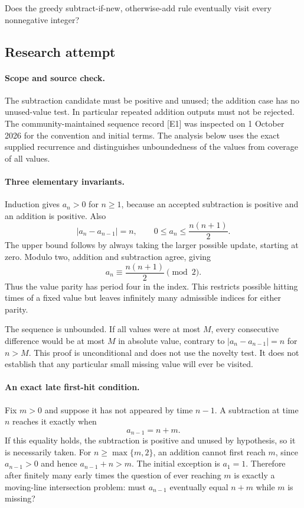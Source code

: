 \documentclass[11pt,a4paper]{article}
\begin{document}
Does the greedy subtract-if-new, otherwise-add rule eventually visit every nonnegative integer?

\subsection{Research attempt}

\paragraph{Scope and source check.}
The subtraction candidate must be positive and unused; the addition
case has no unused-value test. In particular repeated addition outputs
must not be rejected. The community-maintained sequence record [E1]
was inspected on 1 October 2026 for the convention and initial terms.
The analysis below uses the exact supplied recurrence and distinguishes
unboundedness of the values from coverage of all values.

\paragraph{Three elementary invariants.}
Induction gives $a_n>0$ for $n\ge1$, because an accepted subtraction
is positive and an addition is positive. Also
\[
 |a_n-a_{n-1}|=n,\qquad
 0\le a_n\le\frac{n(n+1)}2.
\]
The upper bound follows by always taking the larger possible update,
starting at zero. Modulo two, addition and subtraction agree, giving
\[
                  a_n\equiv\frac{n(n+1)}2\pmod2.
\]
Thus the value parity has period four in the index. This restricts
possible hitting times of a fixed value but leaves infinitely many
admissible indices for either parity.

The sequence is unbounded. If all values were at most $M$, every
consecutive difference would be at most $M$ in absolute value, contrary
to $|a_n-a_{n-1}|=n$ for $n>M$. This proof is unconditional and does
not use the novelty test. It does not establish that any particular
small missing value will ever be visited.

\paragraph{An exact late first-hit condition.}
Fix $m>0$ and suppose it has not appeared by time $n-1$. A subtraction
at time $n$ reaches it exactly when
\[
                            a_{n-1}=n+m.
\]
If this equality holds, the subtraction is positive and unused by
hypothesis, so it is necessarily taken. For $n\ge\max\{m,2\}$, an
addition cannot first reach $m$, since $a_{n-1}>0$ and hence
$a_{n-1}+n>m$. The initial exception is $a_1=1$. Therefore after
finitely many early times the
question of ever reaching $m$ is exactly a moving-line intersection
problem: must $a_{n-1}$ eventually equal $n+m$ while $m$ is missing?
\end{document}
